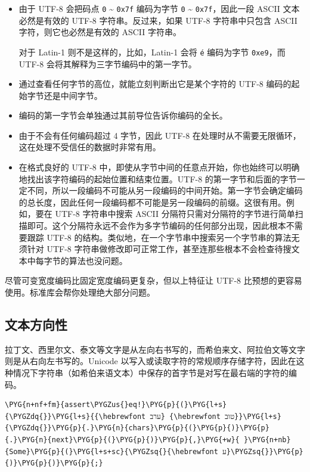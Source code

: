 \begin{itemize}
\item 由于 UTF-8 会把码点 \texttt{0} \textasciitilde{} \texttt{0x7f} 编码为字节 \texttt{0} \textasciitilde{} \texttt{0x7f}，因此一段 ASCII 文本必然是有效的 UTF-8 字符串。反过来，如果 UTF-8 字符串中只包含 ASCII 字符，则它也必然是有效的 ASCII 字符串。

对于 Latin-1 则不是这样的，比如，Latin-1 会将 \texttt{é} 编码为字节 \texttt{0xe9}，而 UTF-8 会将其解释为三字节编码中的第一字节。
\item 通过查看任何字节的高位，就能立刻判断出它是某个字符的 UTF-8 编码的起始字节还是中间字节。
\item 编码的第一字节会单独通过其前导位告诉你编码的全长。
\item 由于不会有任何编码超过 4 字节，因此 UTF-8 在处理时从不需要无限循环，这在处理不受信任的数据时非常有用。
\item 在格式良好的 UTF-8 中，即使从字节中间的任意点开始，你也始终可以明确地找出该字符编码的起始位置和结束位置。UTF-8 的第一字节和后面的字节一定不同，所以一段编码不可能从另一段编码的中间开始。第一字节会确定编码的总长度，因此任何一段编码都不可能是另一段编码的前缀。这很有用。例如，要在 UTF-8 字符串中搜索 ASCII 分隔符只需对分隔符的字节进行简单扫描即可。这个分隔符永远不会作为多字节编码的任何部分出现，因此根本不需要跟踪 UTF-8 的结构。类似地，在一个字节串中搜索另一个字节串的算法无须针对 UTF-8 字符串做修改即可正常工作，甚至连那些根本不会检查待搜文本中每字节的算法也没问题。
\end{itemize}

尽管可变宽度编码比固定宽度编码更复杂，但以上特征让 UTF-8 比预想的更容易使用。标准库会帮你处理绝大部分问题。

\subsection{文本方向性}

拉丁文、西里尔文、泰文等文字是从左向右书写的，而希伯来文、阿拉伯文等文字则是从右向左书写的。Unicode 以写入或读取字符的常规顺序存储字符，因此在这种情况下字符串（如希伯来语文本）中保存的首字节是对写在最右端的字符的编码。

\begin{Verbatim}[commandchars=\\\{\},breaklines=true,breakanywhere=true,fontsize=\codefont,xleftmargin=17bp]
\PYG{n+nf+fm}{assert\PYGZus{}eq!}\PYG{p}{(}\PYG{l+s}{\PYGZdq{}}\PYG{l+s}{{\hebrewfont ערב} {\hebrewfont טוב}}\PYG{l+s}{\PYGZdq{}}\PYG{p}{.}\PYG{n}{chars}\PYG{p}{(}\PYG{p}{)}\PYG{p}{.}\PYG{n}{next}\PYG{p}{(}\PYG{p}{)}\PYG{p}{,}\PYG{+w}{ }\PYG{n+nb}{Some}\PYG{p}{(}\PYG{l+s+sc}{\PYGZsq{}{\hebrewfont ע}\PYGZsq{}}\PYG{p}{)}\PYG{p}{)}\PYG{p}{;}
\end{Verbatim}


